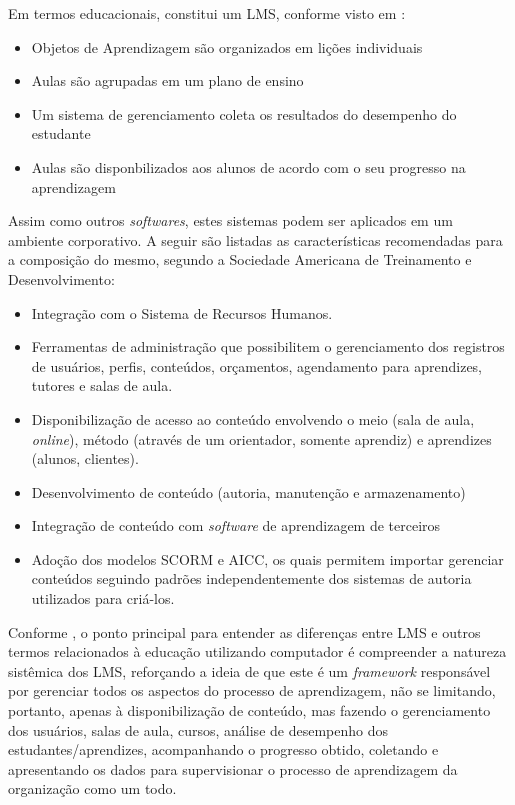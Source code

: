 \documentclass[12pt]{article}
\begin{document}
Em termos educacionais, constitui um LMS, conforme visto em \cite{bailey1992wanted}:

\begin{itemize}
 \item Objetos de Aprendizagem são organizados em lições individuais
 \item Aulas são agrupadas em um plano de ensino
 \item Um sistema de gerenciamento coleta os resultados do desempenho do estudante
 \item Aulas são disponbilizados aos alunos de acordo com o seu progresso na aprendizagem
\end{itemize}

Assim como outros \textit{softwares}, estes sistemas podem ser aplicados em um ambiente corporativo. A seguir são listadas as características 
recomendadas para a composição do mesmo, segundo a Sociedade Americana de Treinamento e Desenvolvimento:

\begin{itemize}
 \item Integração com o Sistema de Recursos Humanos.
 \item Ferramentas de administração que possibilitem o gerenciamento dos registros de usuários, perfis, conteúdos, orçamentos, agendamento para 
 aprendizes, tutores e salas de aula.
 \item Disponibilização de acesso ao conteúdo envolvendo o meio (sala de aula, \textit{online}), método (através de um orientador, 
 somente aprendiz) e aprendizes (alunos, clientes).
 \item Desenvolvimento de conteúdo (autoria, manutenção e armazenamento)
 \item Integração de conteúdo com \textit{software} de aprendizagem de terceiros
 \item Adoção dos modelos SCORM e AICC, os quais permitem importar gerenciar conteúdos seguindo padrões independentemente dos sistemas de 
 autoria utilizados para criá-los.
\end{itemize}

Conforme \cite{watson2007learning}, o ponto principal para entender as diferenças entre LMS e outros termos relacionados à educação utilizando 
computador é compreender a natureza sistêmica dos LMS, reforçando a ideia de que este é um \textit{framework} responsável por gerenciar todos 
os aspectos do processo de aprendizagem, não se limitando, portanto, apenas à disponibilização de conteúdo, mas fazendo o gerenciamento dos 
usuários, salas de aula, cursos, análise de desempenho dos estudantes/aprendizes, acompanhando o progresso obtido, coletando e apresentando os 
dados para supervisionar o processo de aprendizagem da organização como um todo.
\end{document}
